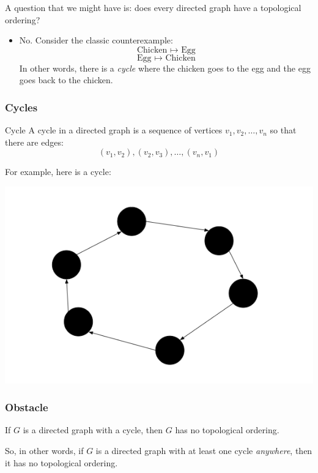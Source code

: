 \documentclass[letterpaper]{article}
\begin{document}
\bigskip 

\noindent
A question that we might have is: does every directed graph have a topological ordering?
\begin{itemize}
    \item No. Consider the classic counterexample:
    \[\text{Chicken } \mapsto \text{ Egg}\]
    \[\text{Egg } \mapsto \text{ Chicken}\]
    In other words, there is a \emph{cycle} where the chicken goes to the egg and the egg goes back to the chicken. 
\end{itemize}

\subsubsection{Cycles}
\begin{definition}{Cycle}{}
    A cycle in a directed graph is a sequence of vertices $v_1, v_2, \dots, v_n$ so that there are edges: 
    \[(v_1, v_2), (v_2, v_3), \dots, (v_n, v_1)\]
\end{definition}
For example, here is a cycle:
\begin{center}
    \includegraphics[scale=0.7]{assets/dir_graph_1.png}
\end{center}

\subsubsection{Obstacle}
\begin{proposition}
    If $G$ is a directed graph with a cycle, then $G$ has no topological ordering.
\end{proposition}
So, in other words, if $G$ is a directed graph with at least one cycle \emph{anywhere}, then it has no topological ordering.
\end{document}
